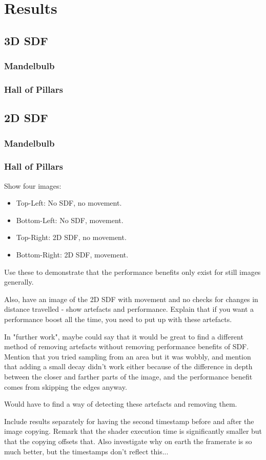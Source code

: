 \chapter{Results}
\label{chapter4}

\section{3D SDF}

\subsection{Mandelbulb}

\subsection{Hall of Pillars}

\section{2D SDF}

\subsection{Mandelbulb}

\subsection{Hall of Pillars}

Show four images:
\begin{itemize}
	\item Top-Left: No SDF, no movement.
	\item Bottom-Left: No SDF, movement.
	\item Top-Right: 2D SDF, no movement.
	\item Bottom-Right: 2D SDF, movement.
\end{itemize}

Use these to demonstrate that the performance benefits only exist for still images generally.

Also, have an image of the 2D SDF with movement and no checks for changes in distance travelled - show artefacts and performance. Explain that if you want a performance boost all the time, you need to put up with these artefacts.

In "further work", maybe could say that it would be great to find a different method of removing artefacts without removing performance benefits of SDF. Mention that you tried sampling from an area but it was wobbly, and mention that adding a small decay didn't work either because of the difference in depth between the closer and farther parts of the image, and the performance benefit comes from skipping the edges anyway.

Would have to find a way of detecting these artefacts and removing them.

Include results separately for having the second timestamp before and after the image copying. Remark that the shader execution time is significantly smaller but that the copying offsets that. Also investigate why on earth the framerate is so much better, but the timestamps don't reflect this...